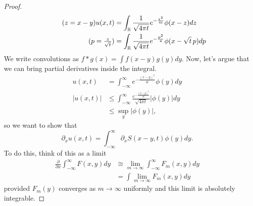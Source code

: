 		\begin{proof}
			\begin{align*}
				\tag{\( z = x - y \)}u(x, t) &= \int_{\mathbb{R}} \frac{1}{\sqrt{4 \pi t}} e^{- \frac{z^{2}}{4t}} \phi(x - z) dz  \\
				\tag{\( p = \frac{z}{\sqrt{t}} \)} &= \int_{\mathbb{R}} \frac{1}{\sqrt{4 \pi t}} e^{- \frac{p^{2}}{4}} \phi(x - \sqrt{t} \, p) dp
			\end{align*}
				We write convolutions as \( f * g(x) = \int f(x - y) g(y) dy \). Now, let's argue that we can bring partial derivatives inside the integral.
				\begin{align*}
					u(x, t) &= \int_{- \infty}^{\infty} e^{- \frac{(x - y)^{2}}{4t}} \phi(y) dy \\
					|u(x, t)| &\le \int_{- \infty}^{\infty}  \frac{e^{- \frac{(x - y)^{2}}{4t}}}{\sqrt{4 \pi t}} | \phi(y)| dy \\
										&\le \sup_{y} | \phi(y)|,
				\end{align*}
				so we want to show that 
				\[ \partial_{x} u(x, t) = \int_{- \infty}^{\infty} \partial_{x} S(x-y, t) \phi(y) dy. \]
				To do this, think of this as a limit
				\begin{align*}
					\frac{\partial}{\partial x} \int_{- \infty}^{\infty} F(x, y) dy &\cong \lim_{m \to \infty} \int_{- \infty}^{\infty} F_{m}(x, y) dy \\
																																					&= \int \lim_{m \to \infty} F_{m}(x, y) dy
				\end{align*}
				provided \( F_{m}(y) \) converges as \( m \rightarrow \infty \) uniformly and this limit is absolutely integrable.
		\end{proof}
